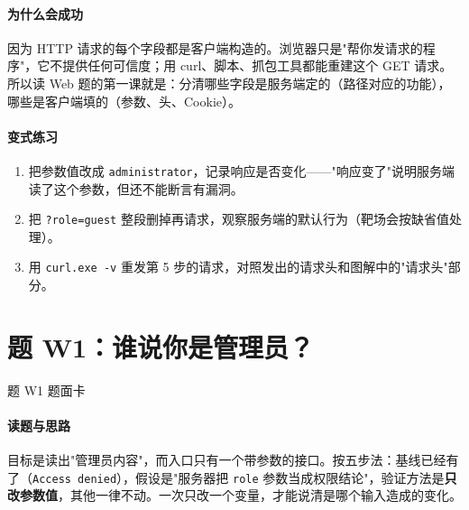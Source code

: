 \documentclass[UTF8,12pt,oneside]{ctexbook}
\begin{document}
\paragraph{为什么会成功}
因为 HTTP 请求的每个字段都是客户端构造的。浏览器只是"帮你发请求的程序"，它不提供任何可信度；用 curl、脚本、抓包工具都能重建这个 GET 请求。所以读 Web 题的第一课就是：分清哪些字段是服务端定的（路径对应的功能），哪些是客户端填的（参数、头、Cookie）。


\paragraph{变式练习}
\begin{enumerate}
\item 把参数值改成 \verb|administrator|，记录响应是否变化——"响应变了"说明服务端读了这个参数，但还不能断言有漏洞。
\item 把 \verb|?role=guest| 整段删掉再请求，观察服务端的默认行为（靶场会按缺省值处理）。
\item 用 \verb|curl.exe -v| 重发第 5 步的请求，对照发出的请求头和图解中的"请求头"部分。
\end{enumerate}

\section{题 W1：谁说你是管理员？}

\begin{challenge}{题 W1 题面卡}
\end{challenge}

\paragraph{读题与思路}
目标是读出"管理员内容"，而入口只有一个带参数的接口。按五步法：基线已经有了（\verb|Access denied|），假设是"服务器把 \verb|role| 参数当成权限结论"，验证方法是\textbf{只改参数值}，其他一律不动。一次只改一个变量，才能说清是哪个输入造成的变化。
\end{document}
